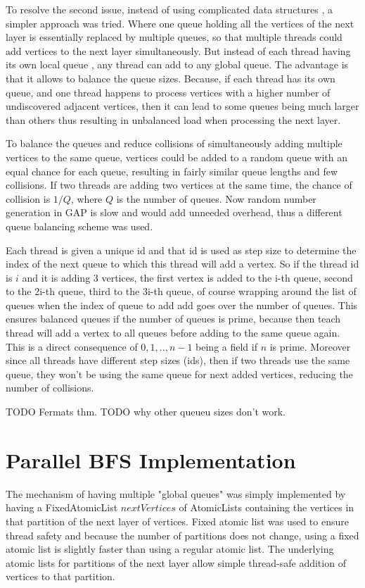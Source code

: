 \documentclass{report}
\theoremstyle{plain}
\theoremstyle{definition}
\theoremstyle{remark}
\begin{document}
To resolve the second issue, instead of using complicated data structures \cite{Leiserson}, a simpler approach was tried. Where one queue holding all the vertices of the next layer is essentially replaced by multiple queues, so that multiple threads could add vertices to the next layer simultaneously. But instead of each thread having its own local queue \cite{cong2008solving, zhang2006parallel}, any thread can add to any global queue. The advantage is that it allows to balance the queue sizes. Because, if each thread has its own queue, and one thread happens to process vertices with a higher number of undiscovered adjacent vertices, then it can lead to some queues being much larger than others thus resulting in unbalanced load when processing the next layer.

To balance the queues and reduce collisions of simultaneously adding multiple vertices to the same queue, vertices could be added to a random queue with an equal chance for each queue, resulting in fairly similar queue lengths and few collisions. If two threads are adding two vertices at the same time, the chance of collision is $1/Q$, where $Q$ is the number of queues. Now random number generation in GAP is slow and would add unneeded overhead, thus a different queue balancing scheme was used.

Each thread is given a unique id and that id is used as step size to determine the index of the next queue to which this thread will add a vertex. So if the thread id is $i$ and it is adding 3 vertices, the first vertex is added to the i-th queue, second to the 2i-th queue, third to the 3i-th queue, of course wrapping around the list of queues when the index of queue to add add goes over the number of queues. This ensures balanced queues if the number of queues is prime, because then teach thread will add a vertex to all queues before adding to the same queue again. This is a direct consequence of ${0, 1,..,n-1}$ being a field if $n$ is prime. Moreover since all threads have different step sizes (ids), then if two threads use the same queue, they won't be using the same queue for next added vertices, reducing the number of collisions.

TODO Fermats thm. TODO why other queueu sizes don't work.

\section{Parallel BFS Implementation}

The mechanism of having multiple "global queues" was simply implemented by having a FixedAtomicList $nextVertices$ of AtomicLists containing the vertices in that partition of the next layer of vertices. Fixed atomic list was used to ensure thread safety and because the number of partitions does not change, using a fixed atomic list is slightly faster than using a regular atomic list. The underlying atomic lists for partitions of the next layer allow simple thread-safe addition of vertices to that partition.
\end{document}
